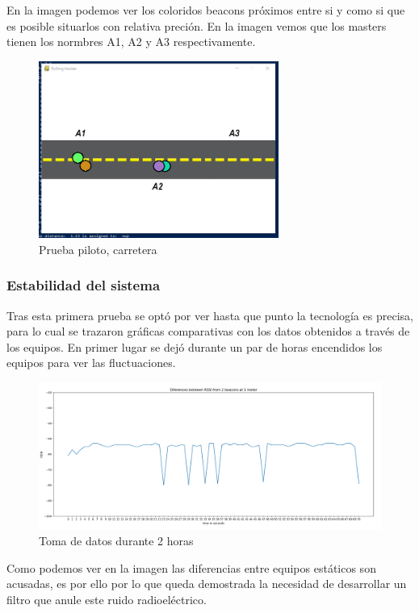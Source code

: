 \documentclass[a4paper ,12pt, onecolumn]{article}
\begin{document}
            En la imagen podemos ver los coloridos beacons próximos entre si y como si que es posible situarlos con relativa preción. En la imagen 
            vemos que los masters tienen los normbres A1, A2 y A3 respectivamente.
            \begin{center}
                \begin{figure}[]
                    \centering
                    \includegraphics[width=0.7\textwidth]{../../Memmory/images/road_1.PNG}
                    \caption{Prueba piloto, carretera}
                    \label{fig:mesh11}
                \end{figure}
            \end{center}
        \subsubsection{Estabilidad del sistema}
            Tras esta primera prueba se optó por ver hasta que punto la tecnología es precisa, para lo cual se trazaron gráficas comparativas
            con los datos obtenidos a través de los equipos. En primer lugar se dejó durante un par de horas encendidos los equipos para ver las 
            fluctuaciones.
            \begin{center}
                \begin{figure}[]
                    \centering
                    \includegraphics[width=1\textwidth]{../../Memmory/images/5min_beacon_rssi.PNG}
                    \caption{Toma de datos durante 2 horas}
                    \label{fig:mesh11}
                \end{figure}
            \end{center}
            Como podemos ver en la imagen las diferencias entre equipos estáticos son acusadas, es por ello por lo que queda demostrada la necesidad de
            desarrollar un filtro que anule este ruido radioeléctrico.
\end{document}
